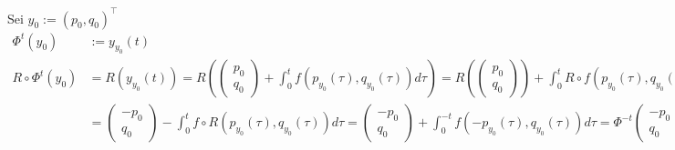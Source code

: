 \begin{solution}
Sei $y_0 := (p_0,q_0)^{\top}$
  \begin{align*}
    \Phi^t(y_0) &:= y_{y_0}(t) \\
    R \circ \Phi^t(y_0) &= R(y_{y_0}(t)) = R\left(
    \begin{pmatrix}
      p_0 \\ q_0
    \end{pmatrix}
    + \int_0^t f(p_{y_0}(\tau),q_{y_0}(\tau)) d\tau\right)
    = R\left(
    \begin{pmatrix}
      p_0 \\ q_0
    \end{pmatrix}\right)
    + \int_0^t R\circ f(p_{y_0}(\tau),q_{y_0}(\tau)) d\tau\\
    &= \begin{pmatrix}
      -p_0 \\ q_0
    \end{pmatrix}
    - \int_0^t f\circ R(p_{y_0}(\tau),q_{y_0}(\tau)) d\tau
    = \begin{pmatrix}
      -p_0 \\ q_0
    \end{pmatrix}
    + \int_0^{-t} f(-p_{y_0}(\tau),q_{y_0}(\tau)) d\tau
    = \Phi^{-t}\begin{pmatrix}
      -p_0 \\ q_0
    \end{pmatrix} =
    \Phi^{-t} \circ R(y_0)
  \end{align*}
\end{solution}
